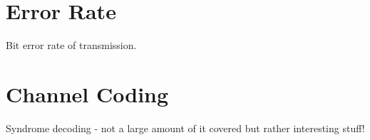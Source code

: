 \documentclass[../main.tex]{subfiles}
\begin{document}
\section{Error Rate}

Bit error rate of transmission.


\section{Channel Coding} \label{sec_Channel Coding}

Syndrome decoding - not a large amount of it covered but rather interesting stuff!
\end{document}
